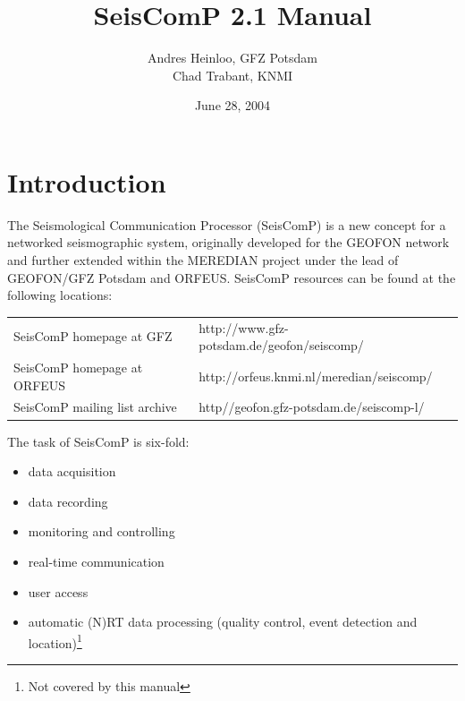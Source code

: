 \documentclass[11pt,a4paper,titlepage]{article}
\title{SeisComP 2.1 Manual}
\author{Andres Heinloo, GFZ Potsdam \\ Chad Trabant, KNMI }
\date{June 28, 2004}
\begin{document}
\maketitle

\setcounter{page}{2}



\tableofcontents

\clearpage


\section{Introduction}

The Seismological Communication Processor (SeisComP) is a new concept for a
networked seismographic system, originally developed for the GEOFON network
and further extended within the MEREDIAN project under the lead of
GEOFON/GFZ Potsdam and ORFEUS. SeisComP resources can be found at the
following locations:

\begin{table}[h!]
\centering
\begin{tabular}{ll}
SeisComP homepage at GFZ      & http://www.gfz-potsdam.de/geofon/seiscomp/ \\
SeisComP homepage at ORFEUS   & http://orfeus.knmi.nl/meredian/seiscomp/   \\
SeisComP mailing list archive & http//geofon.gfz-potsdam.de/seiscomp-l/    \\
\end{tabular}
\end{table}

The task of SeisComP is six-fold:
\begin{itemize}
\item data acquisition
\item data recording
\item monitoring and controlling
\item real-time communication
\item user access
\item automatic (N)RT data processing (quality control, event detection and
location)\footnote{Not covered by this manual}
\end{itemize}
\end{document}
